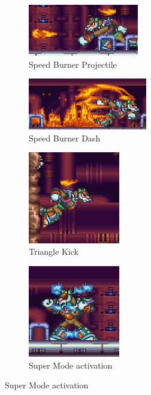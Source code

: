 \begin{figure}[htp]
	\centering
	\begin{subfigure}{0.45\linewidth}
		\centering
		\includegraphics[height= 2.25cm]{figures/X2/Flame_stag/Stag_projectile.png}
		\caption{Speed Burner Projectile}
	\end{subfigure}
	\begin{subfigure}{0.45\linewidth}
		\centering
		\includegraphics[height=2.25cm]{figures/X2/Flame_stag/Stag_dash.png}
		\caption{Speed Burner Dash}
	\end{subfigure}
		\begin{subfigure}{0.4\linewidth}
		\centering
		\includegraphics[height=4cm]{figures/X2/Flame_stag/Stag_triangle.png}
		\caption{Triangle Kick}
	\end{subfigure}
	\begin{subfigure}{0.4\linewidth}
		\centering
		\includegraphics[height=4cm]{figures/X2/Flame_stag/Stag_phase_2.png}
		\caption{Super Mode activation}
	\end{subfigure}

\end{figure}
